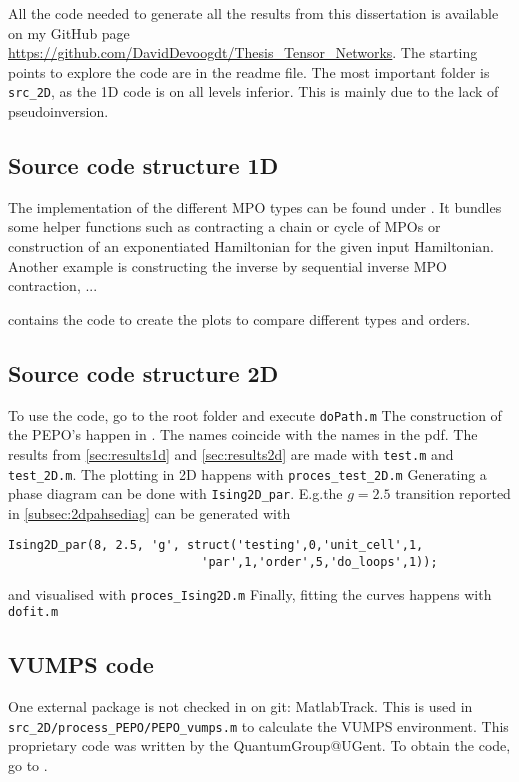 
All the code needed to generate all the results from this dissertation is available on my GitHub page \url{https://github.com/DavidDevoogdt/Thesis_Tensor_Networks}. The starting points to explore the code are in the readme file. The most important folder is \verb#src_2D#, as the 1D code is on all levels inferior. This is mainly due to the lack of pseudoinversion.

\subsection{Source code structure 1D}

The implementation of the different \Gls{MPO} types can be found under . It bundles some helper functions such as contracting a chain or cycle of  \Glspl{MPO} or construction of an exponentiated Hamiltonian for the given input Hamiltonian. Another example is constructing the inverse by sequential inverse \Gls{MPO} contraction, ...

 contains the code to create the plots to compare different types and orders.

\subsection{Source code structure 2D}

To use the code, go to the root folder and execute  \verb#doPath.m#
The construction of the PEPO's happen in . The names coincide with the names in the pdf.
The results from \cref{sec:results1d} and \cref{sec:results2d} are made with  \verb#test.m# and \verb#test_2D.m#. The plotting in 2D happens with \verb#proces_test_2D.m#
Generating a phase diagram can be done with \verb#Ising2D_par#. E.g.the $g=2.5$ transition reported in \cref{subsec:2dpahsediag} can be generated with
\begin{verbatim}
Ising2D_par(8, 2.5, 'g', struct('testing',0,'unit_cell',1,
                           'par',1,'order',5,'do_loops',1));
\end{verbatim}
and visualised with \verb#proces_Ising2D.m# Finally, fitting the curves happens with \verb#dofit.m#

\subsection{ VUMPS code}
One external package is not checked in on git: MatlabTrack. This is used in  \verb#src_2D/process_PEPO/PEPO_vumps.m# to calculate the \Gls{VUMPS} environment. This proprietary code was written by the QuantumGroup@UGent. To obtain the code, go to .
